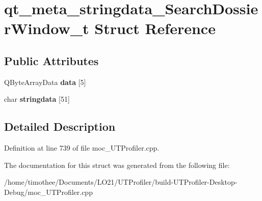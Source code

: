\hypertarget{structqt__meta__stringdata___search_dossier_window__t}{\section{qt\-\_\-meta\-\_\-stringdata\-\_\-\-Search\-Dossier\-Window\-\_\-t Struct Reference}
\label{structqt__meta__stringdata___search_dossier_window__t}
}
\subsection*{Public Attributes}
\begin{DoxyCompactItemize}
\item 
\hypertarget{structqt__meta__stringdata___search_dossier_window__t_ac9d2789437eef387995aaad096d92f17}{Q\-Byte\-Array\-Data {\bfseries data} \mbox{[}5\mbox{]}}\label{structqt__meta__stringdata___search_dossier_window__t_ac9d2789437eef387995aaad096d92f17}

\item 
\hypertarget{structqt__meta__stringdata___search_dossier_window__t_aa2489fbe3f2fcbe10c9a0e076c09c972}{char {\bfseries stringdata} \mbox{[}51\mbox{]}}\label{structqt__meta__stringdata___search_dossier_window__t_aa2489fbe3f2fcbe10c9a0e076c09c972}

\end{DoxyCompactItemize}


\subsection{Detailed Description}


Definition at line 739 of file moc\-\_\-\-U\-T\-Profiler.\-cpp.



The documentation for this struct was generated from the following file\-:\begin{DoxyCompactItemize}
\item 
/home/timothee/\-Documents/\-L\-O21/\-U\-T\-Profiler/build-\/\-U\-T\-Profiler-\/\-Desktop-\/\-Debug/moc\-\_\-\-U\-T\-Profiler.\-cpp\end{DoxyCompactItemize}

